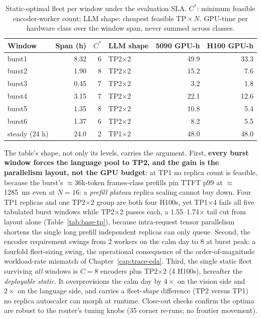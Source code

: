 \begin{table}[htbp]
\centering
\caption[Static-optimal fleet per window]{Static-optimal fleet per window under
the evaluation SLA. $C^{*}$: minimum feasible encoder-worker count; LLM shape:
cheapest feasible $\mathrm{TP}\times N$. GPU-time per hardware class over the
window span, never summed across classes.}
\label{tab:base-grid}
\small
\begin{tabular}{@{}lrrlrr@{}}
\toprule
Window & Span (h) & $C^{*}$ & LLM shape & 5090 GPU-h & H100 GPU-h \\
\midrule
burst1 & 8.32 & 6 & TP2$\times$2 & 49.9 & 33.3 \\
burst2 & 1.90 & 8 & TP2$\times$2 & 15.2 & 7.6 \\
burst3 & 0.45 & 7 & TP2$\times$2 & 3.2 & 1.8 \\
burst4 & 3.15 & 7 & TP2$\times$2 & 22.1 & 12.6 \\
burst5 & 1.35 & 8 & TP2$\times$2 & 10.8 & 5.4 \\
burst6 & 1.37 & 6 & TP2$\times$2 & 8.2 & 5.5 \\
steady (24 h) & 24.0 & 2 & TP1$\times$2 & 48.0 & 48.0 \\
\bottomrule
\end{tabular}
\end{table}

The table's shape, not only its levels, carries the argument. First,
\textbf{every burst window forces the
language pool to TP2, and the gain is the parallelism layout, not the GPU
budget}: at TP1 no replica count is feasible, because the burst's
${\approx}36$k-token frames-class prefills pin TTFT p99 at
${\approx}$\SI{1285}{\milli\second} even at $N{=}16$: a \emph{prefill
plateau} replica scaling cannot buy down. Four TP1 replicas and one
TP2$\times$2 group are both four H100s, yet TP1$\times$4 fails all five
tabulated burst windows while TP2$\times$2 passes each, a 1.55--1.74$\times$
tail cut from layout alone (Table~\ref{tab:base-tp}), because intra-request
tensor parallelism shortens the single long prefill independent replicas can
only queue. Second, the encoder requirement swings from 2 workers on the calm
day to 8 at burst peak: a fourfold fleet-sizing swing, the operational consequence
of the order-of-magnitude workload-rate mismatch of
Chapter~\ref{cap:trace-eda}. Third, the single static fleet surviving \emph{all}
windows is $C{=}8$ encoders plus TP2$\times$2 (4 H100s), hereafter the
\emph{deployable static}. It overprovisions the calm day by $4\times$ on the
vision side and $2\times$ on the language side, and carries a
fleet-\emph{shape} difference (TP2 versus TP1) no replica autoscaler can morph
at runtime. Close-out checks confirm the optima are robust to the router's
tuning knobs (35 corner re-runs; no frontier movement).


